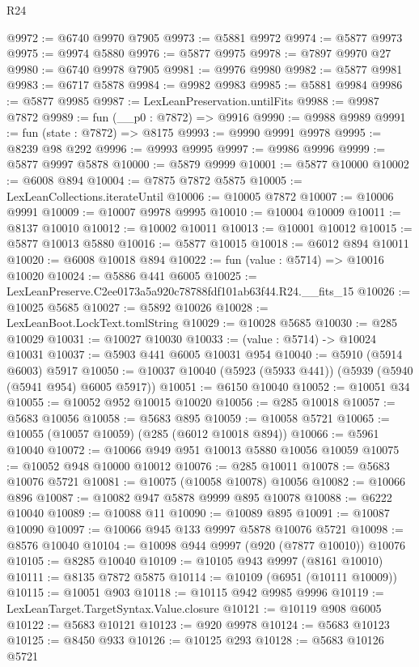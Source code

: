 \begin{lexlean}{R24}
\begin{coremodule}
@9972 := @6740 @9970 @7905
@9973 := @5881 @9972
@9974 := @5877 @9973
@9975 := @9974 @5880
@9976 := @5877 @9975
@9978 := @7897 @9970 @27
@9980 := @6740 @9978 @7905
@9981 := @9976 @9980
@9982 := @5877 @9981
@9983 := @6717 @5878
@9984 := @9982 @9983
@9985 := @5881 @9984
@9986 := @5877 @9985
@9987 := LexLeanPreservation.untilFits
@9988 := @9987 @7872
@9989 := fun (__p0 : @7872) => @9916
@9990 := @9988 @9989
@9991 := fun (state : @7872) => @8175
@9993 := @9990 @9991 @9978
@9995 := @8239 @98 @292
@9996 := @9993 @9995
@9997 := @9986 @9996
@9999 := @5877 @9997 @5878
@10000 := @5879 @9999
@10001 := @5877 @10000
@10002 := @6008 @894
@10004 := @7875 @7872 @5875
@10005 := LexLeanCollections.iterateUntil
@10006 := @10005 @7872
@10007 := @10006 @9991
@10009 := @10007 @9978 @9995
@10010 := @10004 @10009
@10011 := @8137 @10010
@10012 := @10002 @10011
@10013 := @10001 @10012
@10015 := @5877 @10013 @5880
@10016 := @5877 @10015
@10018 := @6012 @894 @10011
@10020 := @6008 @10018 @894
@10022 := fun (value : @5714) => @10016 @10020
@10024 := @5886 @441 @6005
@10025 := LexLeanPreserve.C2ee0173a5a920c78788fdf101ab63f44.R24.__fits_15
@10026 := @10025 @5685
@10027 := @5892 @10026
@10028 := LexLeanBoot.LockText.tomlString
@10029 := @10028 @5685
@10030 := @285 @10029
@10031 := @10027 @10030
@10033 := (value : @5714) -> @10024 @10031
@10037 := @5903 @441 @6005 @10031 @954
@10040 := @5910 (@5914 @6003) @5917
@10050 := @10037 @10040 (@5923 (@5933 @441)) (@5939 (@5940 (@5941 @954) @6005 @5917))
@10051 := @6150 @10040
@10052 := @10051 @34
@10055 := @10052 @952 @10015 @10020
@10056 := @285 @10018
@10057 := @5683 @10056
@10058 := @5683 @895
@10059 := @10058 @5721
@10065 := @10055 (@10057 @10059) (@285 (@6012 @10018 @894))
@10066 := @5961 @10040
@10072 := @10066 @949 @951 @10013 @5880 @10056 @10059
@10075 := @10052 @948 @10000 @10012
@10076 := @285 @10011
@10078 := @5683 @10076 @5721
@10081 := @10075 (@10058 @10078) @10056
@10082 := @10066 @896
@10087 := @10082 @947 @5878 @9999 @895 @10078
@10088 := @6222 @10040
@10089 := @10088 @11
@10090 := @10089 @895
@10091 := @10087 @10090
@10097 := @10066 @945 @133 @9997 @5878 @10076 @5721
@10098 := @8576 @10040
@10104 := @10098 @944 @9997 (@920 (@7877 @10010)) @10076
@10105 := @8285 @10040
@10109 := @10105 @943 @9997 (@8161 @10010)
@10111 := @8135 @7872 @5875
@10114 := @10109 (@6951 (@10111 @10009))
@10115 := @10051 @903
@10118 := @10115 @942 @9985 @9996
@10119 := LexLeanTarget.TargetSyntax.Value.closure
@10121 := @10119 @908 @6005
@10122 := @5683 @10121
@10123 := @920 @9978
@10124 := @5683 @10123
@10125 := @8450 @933
@10126 := @10125 @293
@10128 := @5683 @10126 @5721

\end{coremodule}
\end{lexlean}
